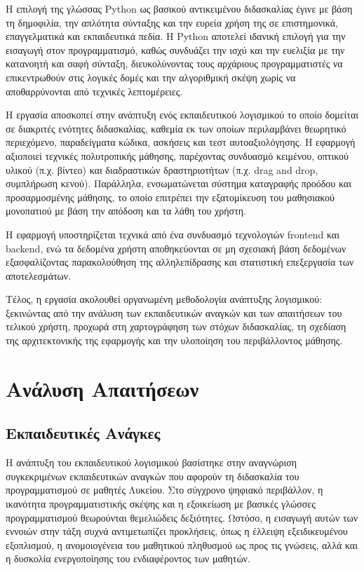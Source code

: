 \documentclass[11pt]{report}
\begin{document}
Η επιλογή της γλώσσας Python ως βασικού αντικειμένου διδασκαλίας έγινε με βάση τη δημοφιλία, την απλότητα σύνταξης και την ευρεία χρήση της σε επιστημονικά, επαγγελματικά και εκπαιδευτικά πεδία. Η Python αποτελεί ιδανική επιλογή για την εισαγωγή στον προγραμματισμό, καθώς συνδυάζει την ισχύ και την ευελιξία με την κατανοητή και σαφή σύνταξη, διευκολύνοντας τους αρχάριους προγραμματιστές να επικεντρωθούν στις λογικές δομές και την αλγοριθμική σκέψη χωρίς να αποθαρρύνονται από τεχνικές λεπτομέρειες. 

Η εργασία αποσκοπεί στην ανάπτυξη ενός εκπαιδευτικού λογισμικού το οποίο δομείται σε διακριτές ενότητες διδασκαλίας, καθεμία εκ των οποίων περιλαμβάνει θεωρητικό περιεχόμενο, παραδείγματα κώδικα, ασκήσεις και τεστ αυτοαξιολόγησης. Η εφαρμογή αξιοποιεί τεχνικές πολυτροπικής μάθησης, παρέχοντας συνδυασμό κειμένου, οπτικού υλικού (π.χ. βίντεο) και διαδραστικών δραστηριοτήτων (π.χ. drag and drop, συμπλήρωση κενού). Παράλληλα, ενσωματώνεται σύστημα καταγραφής προόδου και προσαρμοσμένης μάθησης, το οποίο επιτρέπει την εξατομίκευση του μαθησιακού μονοπατιού με βάση την απόδοση και τα λάθη του χρήστη. 

Η εφαρμογή υποστηρίζεται τεχνικά από ένα συνδυασμό τεχνολογιών frontend και backend, ενώ τα δεδομένα χρήστη αποθηκεύονται σε μη σχεσιακή βάση δεδομένων εξασφαλίζοντας παρακολούθηση της αλληλεπίδρασης και στατιστική επεξεργασία των αποτελεσμάτων. 

Τέλος, η εργασία ακολουθεί οργανωμένη μεθοδολογία ανάπτυξης λογισμικού: ξεκινώντας από την ανάλυση των εκπαιδευτικών αναγκών και των απαιτήσεων του τελικού χρήστη, προχωρά στη χαρτογράφηση των στόχων διδασκαλίας, τη σχεδίαση της αρχιτεκτονικής της εφαρμογής και την υλοποίηση του περιβάλλοντος μάθησης.

\chapter{Ανάλυση Απαιτήσεων}
\section{Εκπαιδευτικές Ανάγκες}

Η ανάπτυξη του εκπαιδευτικού λογισμικού βασίστηκε στην αναγνώριση συγκεκριμένων εκπαιδευτικών αναγκών που αφορούν τη διδασκαλία του προγραμματισμού σε μαθητές Λυκείου. Στο σύγχρονο ψηφιακό περιβάλλον, η ικανότητα προγραμματιστικής σκέψης και η εξοικείωση με βασικές γλώσσες προγραμματισμού θεωρούνται θεμελιώδεις δεξιότητες. Ωστόσο, η εισαγωγή αυτών των εννοιών στην τάξη συχνά αντιμετωπίζει προκλήσεις, όπως η έλλειψη εξειδικευμένου εξοπλισμού, η ανομοιογένεια του μαθητικού πληθυσμού ως προς τις γνώσεις, αλλά και η δυσκολία ενεργοποίησης του ενδιαφέροντος των μαθητών.
\end{document}
